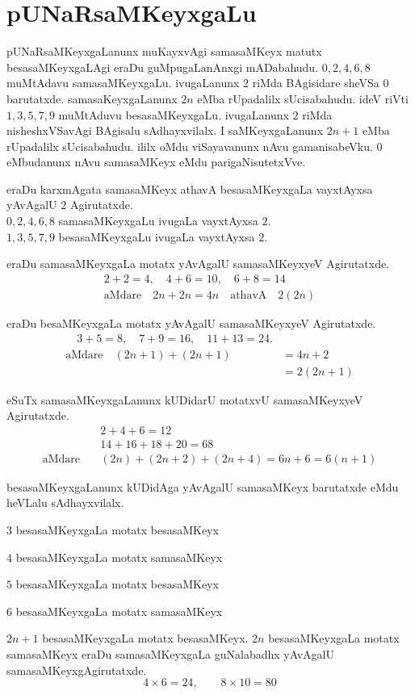 \chapter{pUNaRsaMKeyxgaLu}

pUNaRsaMKeyxgaLanunx muKayxvAgi samasaMKeyx matutx besasaMKeyxgaLAgi eraDu guMpugaLanAnxgi mADabahudu. $0,2,4,6,8$ muMtAdavu samasaMKeyxgaLu. ivugaLanunx $2$ riMda BAgisidare sheVSa $0$ barutatxde. samasaKeyxgaLanunx $2n$ eMba rUpadalilx sUcisabahudu. ideV riVti $1,3,5,7,9$ muMtAduvu besasaMKeyxgaLu. ivugaLanunx $2$ riMda nisheshxVSavAgi BAgisalu sAdhayxvilalx. I saMKeyxgaLanunx $2n+1$ eMba rUpadalilx sUcisabahudu. ililx oMdu viSayavanunx nAvu gamanisabeVku. $0$ eMbudanunx nAvu samasaMKeyx eMdu parigaNisutetxVve.

eraDu karxmAgata samasaMKeyx athavA besasaMKeyxgaLa vayxtAyxsa yAvAgalU $2$ \-Agirutatxde.\\
$0,2,4,6,8$ samasaMKeyxgaLu ivugaLa vayxtAyxsa $2$.\\ 
$1,3,5,7,9$ besasaMKeyxgaLu ivugaLa vayxtAyxsa $2$. 

eraDu samasaMKeyxgaLa motatx yAvAgalU samasaMKeyxyeV Agirutatxde.
\begin{align*}
2+2 =4, \quad 4+6=10, \quad 6+8=14\\
\text{aMdare}\quad 2n+2n =4n\quad \text{athavA}\quad 2(2n)
\end{align*}

eraDu besaMKeyxgaLa motatx yAvAgalU samasaMKeyxyeV Agirutatxde.
\begin{align*}
\quad 3+5=8,\quad 7+9=16,\quad  11+13=24.\\
\text{aMdare}\quad (2n+1)+(2n+1) &= 4n+2\\
 &= 2(2n+1)
\end{align*}

eSuTx samasaMKeyxgaLanunx kUDidarU motatxvU samasaMKeyxyeV Agirutatxde.
\begin{align*}
&2+4+6=12\\
&14+16+18+20=68\\
\text{aMdare}\quad &(2n)+(2n+2)+(2n+4)=6n+6=6(n+1)
\end{align*}

besasaMKeyxgaLanunx kUDidAga yAvAgalU samasaMKeyx barutatxde eMdu heVLalu sAdhayxvilalx.
\begin{description}
\item $3$ besasaMKeyxgaLa motatx besasaMKeyx
\item $4$ besasaMKeyxgaLa motatx samasaMKeyx
\item $5$ besasaMKeyxgaLa motatx besasaMKeyx
\item $6$ besasaMKeyxgaLa motatx samasaMKeyx
\end{description}
$2n+1$ besasaMKeyxgaLa motatx besasaMKeyx. $2n$ besasaMKeyxgaLa motatx samasaMKeyx eraDu samasaMKeyxgaLa guNalabadhx yAvAgalU samasaMKeyxgAgirutatxde.
$$
4\times6=24, \qquad 8\times10 =80
$$

